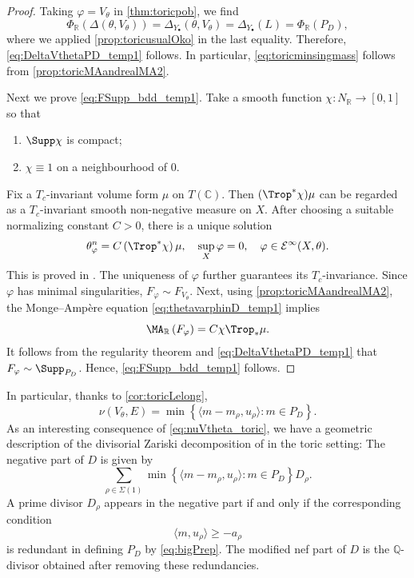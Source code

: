 \begin{proof}
    Taking $\varphi=V_{\theta}$ in \cref{thm:toricpob}, we find
    \[
    \Phi_{\mathbb{R}}\left(  \Delta(\theta,V_{\theta})\right)=\Delta_{Y_{\bullet}}(\theta,V_{\theta})=\Delta_{Y_{\bullet}}(L)=\Phi_{\mathbb{R}}(P_D),
    \]
    where we applied \cref{prop:toricusualOko} in the last equality.
    Therefore, \eqref{eq:DeltaVthetaPD_temp1} follows.
    In particular, \eqref{eq:toricminsingmass} follows from \cref{prop:toricMAandrealMA2}.

    Next we prove \eqref{eq:FSupp_bdd_temp1}. Take a smooth function $\chi\colon N_{\mathbb{R}}\rightarrow [0,1]$ so that
    \begin{enumerate}
        \item\label{itm:chapter-toricb:L672:1} $\Supp \chi$ is compact;
        \item\label{itm:chapter-toricb:L672:2} $\chi\equiv 1$ on a neighbourhood of $0$.
    \end{enumerate}
    Fix a $T_c$-invariant volume form $\mu$ on $T(\mathbb{C})$. Then $(\Trop^*\chi)\mu$ can be regarded as a $T_c$-invariant smooth non-negative measure on $X$. After choosing a suitable normalizing constant $C>0$, there is a unique solution
    \begin{equation}\label{eq:thetavarphinD_temp1}
    \theta_{\varphi}^n=C\left(\Trop^*\chi\right)\mu,\quad \sup_X \varphi=0,\quad \varphi\in \mathcal{E}^{\infty}(X,\theta).
    \end{equation}
    This is proved in \cite[Theorem~B]{BEGZ10}. The uniqueness of $\varphi$ further guarantees its $T_c$-invariance. Since $\varphi$ has minimal singularities, $F_{\varphi}\sim F_{V_{\theta}}$. Next, using \cref{prop:toricMAandrealMA2}, the Monge--Ampère equation \eqref{eq:thetavarphinD_temp1} implies
    \[
    \MA_{\mathbb{R}}\left(F_{\varphi}\right)=C \chi \Trop_*\mu.
    \]
    It follows from the regularity theorem \cite[Theorem~2.19]{BB13} and \eqref{eq:DeltaVthetaPD_temp1} that $F_{\varphi}\sim \Supp_{P_D}$. Hence, \eqref{eq:FSupp_bdd_temp1} follows.
\end{proof}


In particular, thanks to \cref{cor:toricLelong},
\begin{equation}\label{eq:nuVtheta_toric}
\nu(V_{\theta},E)=\min \left\{ \langle m-m_{\rho},u_{\rho}\rangle : m\in P_D \right\}.
\end{equation}
As an interesting consequence of \eqref{eq:nuVtheta_toric}, we have a geometric description of the divisorial Zariski decomposition of \cite{Bou02} in the toric setting: The negative part of $D$ is given by
\[
\sum_{\rho\in \Sigma(1)} \min \left\{ \langle m-m_{\rho},u_{\rho}\rangle : m\in P_D \right\} D_{\rho}.
\]
A prime divisor $D_{\rho}$ appears in the negative part if and only if the corresponding condition
\[
\langle m,u_{\rho} \rangle \geq -a_{\rho}
\]
is redundant in defining $P_D$ by \eqref{eq:bigPrep}. The modified nef part of $D$ is the $\mathbb{Q}$-divisor obtained after removing these redundancies.



